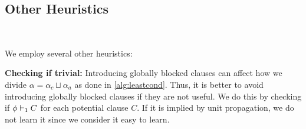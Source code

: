 \subsection{Other Heuristics}~\label{subsec:heuristics}

We employ several other heuristics:




\noindent \textbf{Checking if trivial:} Introducing globally blocked clauses can affect how we divide $\alpha = \alpha_c \sqcup \alpha_a$ as done in \autoref{alg:leastcond}. Thus, it is better to avoid introducing globally blocked clauses if they are not useful. We do this by checking if $\phi \vdash_1 C$ for each potential clause $C$. If it is implied by unit propagation, we do not learn it since we consider it easy to learn.

